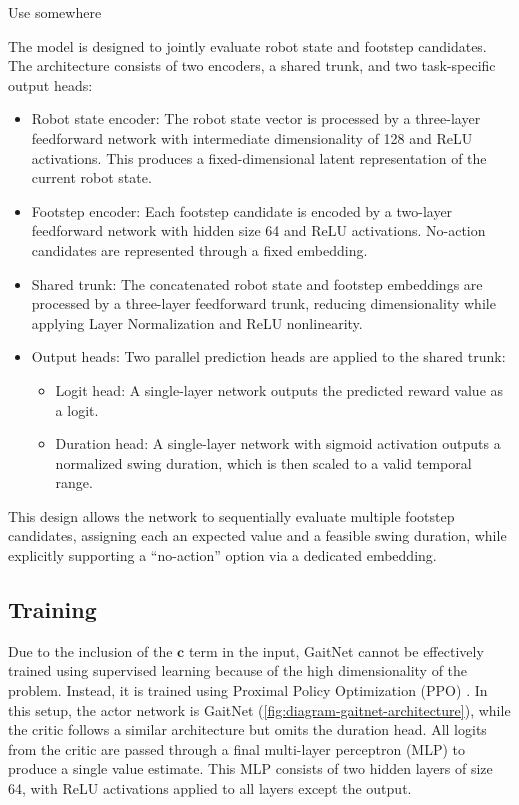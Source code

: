 \begin{todo}
  Use \cite{feng2021deep} somewhere
\end{todo}

The model is designed to jointly evaluate robot state and footstep
candidates. The architecture consists of two encoders, a shared
trunk, and two task-specific output heads:

\begin{itemize}
  \item Robot state encoder: The robot state vector is processed by a
    three-layer feedforward network with intermediate dimensionality
    of 128 and ReLU activations. This produces a fixed-dimensional
    latent representation of the current robot state.
  \item Footstep encoder: Each footstep candidate is encoded by a
    two-layer feedforward network with hidden size 64 and ReLU
    activations. No-action candidates are represented through a fixed embedding.
  \item Shared trunk: The concatenated robot state and footstep
    embeddings are processed by a three-layer feedforward trunk,
    reducing dimensionality while applying Layer Normalization and
    ReLU nonlinearity.
  \item Output heads: Two parallel prediction heads are applied to
    the shared trunk:
    \begin{itemize}
      \item Logit head: A single-layer network outputs the predicted
        reward value as a logit.
      \item Duration head: A single-layer network with sigmoid
        activation outputs a normalized swing duration, which is then
        scaled to a valid temporal range.
    \end{itemize}
\end{itemize}

This design allows the network to sequentially evaluate multiple
footstep candidates, assigning each an expected value and a feasible
swing duration, while explicitly supporting a “no-action” option via
a dedicated embedding.

\subsection{Training}

Due to the inclusion of the $\mathbf{c}$ term in the input, GaitNet
cannot be effectively trained using supervised learning because of
the high dimensionality of the problem. Instead, it is trained using
Proximal Policy Optimization (PPO) \cite{todo}. In this setup, the
actor network is GaitNet
(\autoref{fig:diagram-gaitnet-architecture}), while the critic
follows a similar architecture but omits the duration head. All
logits from the critic are passed through a final multi-layer
perceptron (MLP) to produce a single value estimate. This MLP
consists of two hidden layers of size 64, with ReLU activations
applied to all layers except the output.

